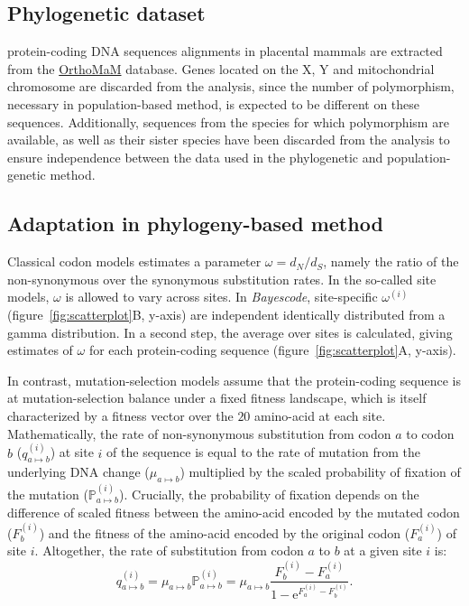 \documentclass{article}
\newcommand{\e}{\mathrm{e}}
\newcommand{\dn}{d_N}
\newcommand{\ds}{d_S}
\newcommand{\dnds}{\dn / \ds}
\newcommand{\proba}{\mathbb{P}}
\begin{document}
    \subsection*{Phylogenetic dataset}
    protein-coding DNA sequences alignments in placental mammals are extracted from the \href{https://www.orthomam.univ-montp2.fr}{OrthoMaM} database\cite{ranwez_orthomam_2007, douzery_orthomam_2014, scornavacca_orthomam_2019}.
    Genes located on the X, Y and mitochondrial chromosome are discarded from the analysis, since the number of polymorphism, necessary in population-based method, is expected to be different on these sequences.
    Additionally, sequences from the species for which polymorphism are available, as well as their sister species have been discarded from the analysis to ensure independence between the data used in the phylogenetic and population-genetic method.

    \subsection*{Adaptation in phylogeny-based method}
    Classical codon models estimates a parameter $\omega=\dnds$, namely the ratio of the non-synonymous over the synonymous substitution rates\cite{muse_likelihood_1994,goldman_codonbased_1994}.
    In the so-called site models, $\omega$ is allowed to vary across sites\cite{yang_codonsubstitution_2000, huelsenbeck_dirichlet_2006}.
    In \textit{Bayescode}, site-specific $\omega^{(i)}$ (figure~\ref{fig:scatterplot}B, y-axis) are independent identically distributed from a gamma distribution\cite{lartillot_phylobayes_2013}.
    In a second step, the average over sites is calculated, giving estimates of $\omega$ for each protein-coding sequence (figure~\ref{fig:scatterplot}A, y-axis).

    In contrast, mutation-selection models assume that the protein-coding sequence is at mutation-selection balance under a fixed fitness landscape, which is itself characterized by a fitness vector over the $20$ amino-acid at each site\cite{yang_mutationselection_2008, halpern_evolutionary_1998, rodrigue_mechanistic_2010}.
    Mathematically, the rate of non-synonymous substitution from codon $a$ to codon $b$ ($q_{a \mapsto b}^{(i)}$) at site $i$ of the sequence is equal to the rate of mutation from the underlying DNA change ($\mu_{a \mapsto b}$) multiplied by the scaled probability of fixation of the mutation ($\proba_{a \mapsto b}^{(i)}$).
    Crucially, the probability of fixation depends on the difference of scaled fitness between the amino-acid encoded by the mutated codon ($F_b^{(i)}$) and the fitness of the amino-acid encoded by the original codon ($F_a^{(i)}$) of site $i$\cite{wright_evolution_1931, fisher_genetical_1930}.
    Altogether, the rate of substitution from codon $a$ to $b$ at a given site $i$ is:
    \begin{equation}
        q_{a \mapsto b}^{(i)} = \mu_{a \mapsto b} \proba_{a \mapsto b}^{(i)} = \mu_{a \mapsto b} \dfrac{F_b^{(i)} - F_a^{(i)}}{1 - \e^{F_a^{(i)} - F_b^{(i)}}}.
    \end{equation}
\end{document}
